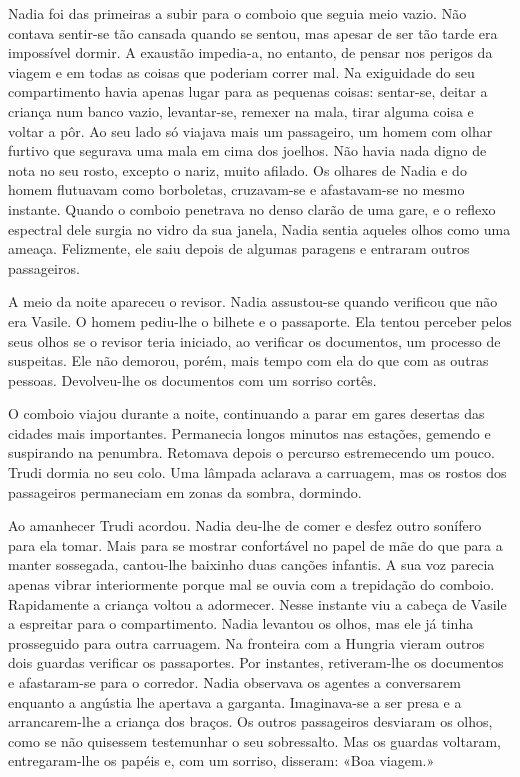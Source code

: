 Nadia foi das primeiras a subir para o comboio que
seguia meio vazio. Não contava sentir-se tão cansada quando se sentou,
mas apesar de ser tão tarde era impossível dormir. A exaustão
impedia-a, no entanto, de pensar nos perigos da viagem e em todas as
coisas que poderiam correr mal. Na exiguidade do seu compartimento havia
apenas lugar para as pequenas coisas: sentar-se, deitar a criança num
banco vazio, levantar-se, remexer na mala, tirar alguma coisa e voltar a
pôr. Ao seu lado só viajava mais um passageiro, um homem com olhar
furtivo que
segurava uma mala em cima dos joelhos. Não havia nada digno de nota no
seu rosto, excepto o nariz, muito afilado. Os olhares de Nadia e do
homem flutuavam como borboletas, cruzavam-se e afastavam-se no mesmo
instante. Quando o comboio penetrava no denso clarão de uma gare, e o
reflexo espectral dele surgia no vidro da sua janela, Nadia sentia
aqueles olhos como uma ameaça. Felizmente, ele saiu depois de algumas
paragens e entraram outros passageiros.

A meio da noite apareceu o revisor. Nadia assustou-se quando verificou
que não era Vasile. O homem pediu-lhe o bilhete e o passaporte. Ela
tentou perceber pelos seus olhos se o revisor teria iniciado, ao
verificar os documentos, um processo de suspeitas. Ele não demorou,
porém, mais tempo com ela do que com as outras pessoas. Devolveu-lhe os
documentos com um sorriso cortês.

O comboio viajou durante a noite, continuando a parar em gares desertas
das cidades mais importantes. Permanecia longos minutos nas estações,
gemendo e suspirando na penumbra. Retomava depois o percurso
estremecendo um pouco. Trudi dormia no seu colo. Uma lâmpada aclarava a
carruagem, mas os rostos dos passageiros permaneciam em zonas da sombra,
dormindo.

Ao amanhecer Trudi acordou. Nadia deu-lhe de comer e desfez outro
sonífero para ela tomar. Mais para se mostrar confortável no papel de
mãe do que para a manter sossegada, cantou-lhe baixinho duas canções
infantis. A sua voz parecia apenas vibrar interiormente porque mal se
ouvia com a trepidação do comboio. Rapidamente a criança voltou a
adormecer. Nesse instante viu a cabeça de
Vasile a espreitar para o compartimento. Nadia levantou os olhos, mas
ele já tinha prosseguido para outra carruagem. Na fronteira com a
Hungria vieram outros dois guardas verificar os passaportes. Por
instantes, retiveram-lhe os documentos e afastaram-se para o corredor.
Nadia observava os agentes a conversarem enquanto a angústia lhe
apertava a garganta. Imaginava-se a ser presa e a arrancarem-lhe a
criança dos braços. Os outros passageiros desviaram os olhos, como se
não quisessem testemunhar o seu sobressalto. Mas os guardas voltaram,
entregaram-lhe os
papéis e, com um sorriso, disseram: «Boa viagem.»

